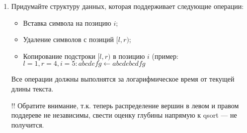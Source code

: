 \begin{enumerate}
	\item Придумайте структуру данных, которая поддерживает следующие операции:
	
	\begin{itemize}
		\item Вставка символа на позицию $i$;
		\item Удаление символов с позиций $[l, r)$;
		\item Копирование подстроки $[l, r)$ в позицию $i$ (пример: $l = 1, r = 4, i = 5 : abcdefg \leftarrow abcdebcdfg$
	\end{itemize}
	
	Все операции должны выполнятся за логарифмическое время от текущей длины текста.
		
	!! Обратите внимание, т.к. теперь распределение вершин в левом и правом поддереве не 
	независимы, свести оценку глубины напрямую к qsort — не получится.
		
\end{enumerate}


